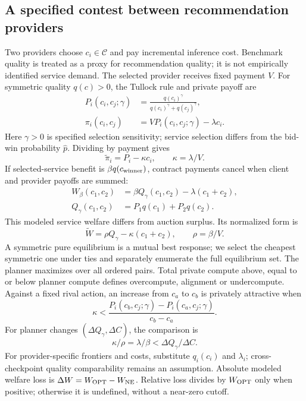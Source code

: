 \documentclass[sigconf,anonymous,nonacm]{acmart}
\begin{document}
\subsection{A specified contest between recommendation providers}
Two providers choose $c_i\in\mathcal C$ and pay incremental inference cost. Benchmark quality is treated as a proxy for recommendation quality; it is not empirically identified service demand. The selected provider receives fixed payment $V$. For symmetric quality $q(c)>0$, the Tullock rule and private payoff are
\begin{equation}\begin{aligned}
P_i(c_i,c_j;\gamma)&=\frac{q(c_i)^\gamma}{q(c_i)^\gamma+q(c_j)^\gamma},\\
\pi_i(c_i,c_j)&=VP_i(c_i,c_j;\gamma)-\lambda c_i.
\end{aligned}\label{eq:contest}\end{equation}
Here $\gamma>0$ is specified selection sensitivity; service selection differs from the bid-win probability $\widehat p$. Dividing by payment gives
\begin{equation}
\widetilde\pi_i=P_i-\kappa c_i,\qquad \kappa=\lambda/V.
\label{eq:normalizedprivate}\end{equation}
If selected-service benefit is $\beta q(c_{\rm winner})$, contract payments cancel when client and provider payoffs are summed:
\begin{equation}\begin{aligned}
W_\beta(c_1,c_2)&=\beta Q_\gamma(c_1,c_2)-\lambda(c_1+c_2),\\
Q_\gamma(c_1,c_2)&=P_1q(c_1)+P_2q(c_2).
\end{aligned}\label{eq:welfare}\end{equation}
This modeled service welfare differs from auction surplus. Its normalized form is
\begin{equation}
\widetilde W=\rho Q_\gamma-\kappa(c_1+c_2),\qquad \rho=\beta/V.
\label{eq:normalizedwelfare}\end{equation}
A symmetric pure equilibrium is a mutual best response; we select the cheapest symmetric one under ties and separately enumerate the full equilibrium set. The planner maximizes over all ordered pairs. Total private compute above, equal to or below planner compute defines overcompute, alignment or undercompute. Against a fixed rival action, an increase from $c_a$ to $c_b$ is privately attractive when
\begin{equation}
\kappa<\frac{P_i(c_b,c_j;\gamma)-P_i(c_a,c_j;\gamma)}{c_b-c_a}.
\label{eq:privatethreshold}\end{equation}
For planner changes $(\Delta Q_\gamma,\Delta C)$, the comparison is
\begin{equation}
\kappa/\rho=\lambda/\beta<\Delta Q_\gamma/\Delta C.
\label{eq:plannerthreshold}\end{equation}
For provider-specific frontiers and costs, substitute $q_i(c_i)$ and $\lambda_i$; cross-checkpoint quality comparability remains an assumption. Absolute modeled welfare loss is $\Delta W=W_{\rm OPT}-W_{\rm NE}$. Relative loss divides by $W_{\rm OPT}$ only when positive; otherwise it is undefined, without a near-zero cutoff.
\end{document}
